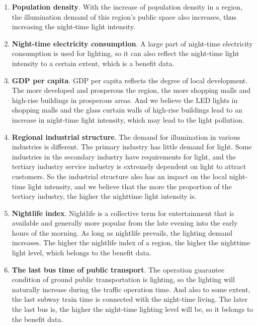 \begin{enumerate}
    \item \textbf{Population density}. With the increase of population density in a region, the illumination demand of this region's public space also increases, thus increasing the night-time light intensity.
 
    \item \textbf{Night-time electricity consumption}. A large part of night-time electricity consumption is used for lighting, so it can also reflect the night-time light intensity to a certain extent, which is a benefit data. 
     
    \item \textbf{GDP per capita}. GDP per capita reflects the degree of local development. The more developed and prosperous the region, the more shopping malls and high-rise buildings in prosperous areas. And we believe the LED lights in shopping malls and the glass curtain walls of high-rise buildings lead to an increase in night-time light intensity, which may lead to the light pollution.
     
    \item \textbf{Regional industrial structure}. The demand for illumination in various industries is different. The primary industry has little demand for light. Some industries in the secondary industry have requirements for light, and the tertiary industry service industry is extremely dependent on light to attract customers. So the industrial structure also has an impact on the local night-time light intensity, and we believe that the more the proportion of the tertiary industry, the higher the nighttime light intensity is. 
     
    \item \textbf{Nightlife index}. Nightlife is a collective term for entertainment that is available and generally more popular from the late evening into the early hours of the morning. As long as nightlife prevails, the lighting demand increases. The higher the nightlife index of a region, the higher the nighttime light level, which belongs to the benefit data.
    
    \item \textbf{The last bus time of public transport}. The operation guarantee condition of ground public transportation is lighting, so the lighting will naturally increase during the traffic operation time. And also to some extent, the last subway train time is connected with the night-time living. The later the last bus is, the higher the night-time lighting level will be, so it belongs to the benefit data.
\end{enumerate}


